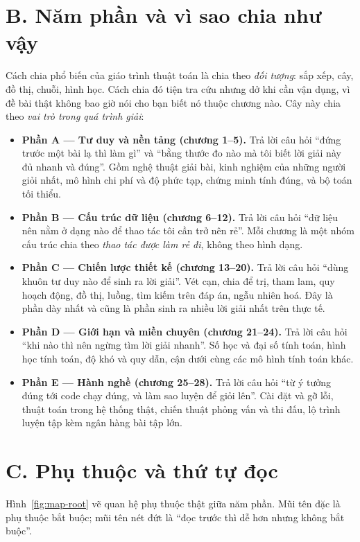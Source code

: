 \documentclass[algorithm.tex]{subfiles}
\begin{document}
\section*{B. Năm phần và vì sao chia như vậy}

Cách chia phổ biến của giáo trình thuật toán là chia theo \emph{đối tượng}: sắp xếp, cây, đồ thị, chuỗi, hình học. Cách chia đó tiện tra cứu nhưng dở khi cần vận dụng, vì đề bài thật không bao giờ nói cho bạn biết nó thuộc chương nào. Cây này chia theo \emph{vai trò trong quá trình giải}:

\begin{itemize}
\item \textbf{Phần A --- Tư duy và nền tảng (chương 1--5).} Trả lời câu hỏi ``đứng trước một bài lạ thì làm gì'' và ``bằng thước đo nào mà tôi biết lời giải này đủ nhanh và đúng''. Gồm nghệ thuật giải bài, kinh nghiệm của những người giỏi nhất, mô hình chi phí và độ phức tạp, chứng minh tính đúng, và bộ toán tối thiểu.
\item \textbf{Phần B --- Cấu trúc dữ liệu (chương 6--12).} Trả lời câu hỏi ``dữ liệu nên nằm ở dạng nào để thao tác tôi cần trở nên rẻ''. Mỗi chương là một nhóm cấu trúc chia theo \emph{thao tác được làm rẻ đi}, không theo hình dạng.
\item \textbf{Phần C --- Chiến lược thiết kế (chương 13--20).} Trả lời câu hỏi ``dùng khuôn tư duy nào để sinh ra lời giải''. Vét cạn, chia để trị, tham lam, quy hoạch động, đồ thị, luồng, tìm kiếm trên đáp án, ngẫu nhiên hoá. Đây là phần dày nhất và cũng là phần sinh ra nhiều lời giải nhất trên thực tế.
\item \textbf{Phần D --- Giới hạn và miền chuyên (chương 21--24).} Trả lời câu hỏi ``khi nào thì nên ngừng tìm lời giải nhanh''. Số học và đại số tính toán, hình học tính toán, độ khó và quy dẫn, cận dưới cùng các mô hình tính toán khác.
\item \textbf{Phần E --- Hành nghề (chương 25--28).} Trả lời câu hỏi ``từ ý tưởng đúng tới code chạy đúng, và làm sao luyện để giỏi lên''. Cài đặt và gỡ lỗi, thuật toán trong hệ thống thật, chiến thuật phỏng vấn và thi đấu, lộ trình luyện tập kèm ngân hàng bài tập lớn.
\end{itemize}

\section*{C. Phụ thuộc và thứ tự đọc}

Hình~\ref{fig:map-root} vẽ quan hệ phụ thuộc thật giữa năm phần. Mũi tên đặc là phụ thuộc bắt buộc; mũi tên nét đứt là ``đọc trước thì dễ hơn nhưng không bắt buộc''.
\end{document}

